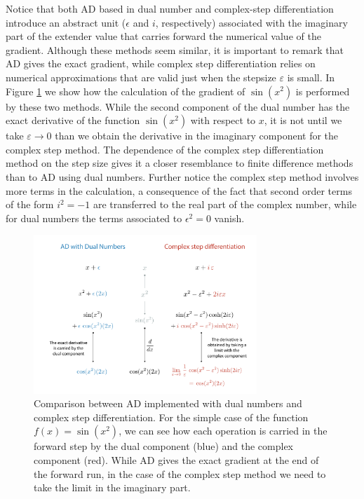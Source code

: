 Notice that both AD based in dual number and complex-step differentiation introduce an abstract unit ($\epsilon$ and $i$, respectively) associated with the imaginary part of the extender value that carries forward the numerical value of the gradient.
Although these methods seem similar, it is important to remark that AD gives the exact gradient, while complex step differentiation relies on numerical approximations that are valid just when the stepsize $\varepsilon$ is small. 
In Figure \ref{fig:complex-step-AD} we show how the calculation of the gradient of $\sin (x^2)$ is performed by these two methods.
While the second component of the dual number has the exact derivative of the function $\sin(x^2)$ with respect to $x$, it is not until we take $\varepsilon \rightarrow 0$ than we obtain the derivative in the imaginary component for the complex step method.
The dependence of the complex step differentiation method on the step size gives it a closer resemblance to finite difference methods than to AD using dual numbers.
Further notice the complex step method involves more terms in the calculation, a consequence of the fact that second order terms of the form $i^2 = -1$ are transferred to the real part of the complex number, while for dual numbers the terms associated to $\epsilon^2 = 0$ vanish. 
\begin{figure}[t]
    \centering
    \includegraphics[width=0.75\textwidth]{tex/figures/complex-step-AD.pdf}
    \caption{Comparison between AD implemented with dual numbers and complex step differentiation. For the simple case of the function $f(x) = \sin(x^2)$, we can see how each operation is carried in the forward step by the dual component (blue) and the complex component (red). While AD gives the exact gradient at the end of the forward run, in the case of the complex step method we need to take the limit in the imaginary part. }
    \label{fig:complex-step-AD}
\end{figure}